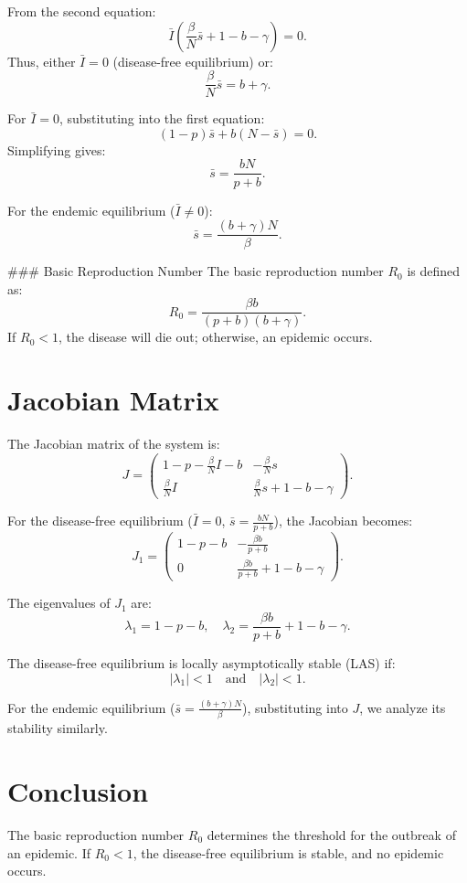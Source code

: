 \documentclass[10pt]{article}
\begin{document}
From the second equation:
\[
\bar{I} \left( \frac{\beta}{N} \bar{s} + 1 - b - \gamma \right) = 0.
\]
Thus, either \( \bar{I} = 0 \) (disease-free equilibrium) or:
\[
\frac{\beta}{N} \bar{s} = b + \gamma.
\]

For \( \bar{I} = 0 \), substituting into the first equation:
\[
(1-p)\bar{s} + b(N - \bar{s}) = 0.
\]
Simplifying gives:
\[
\bar{s} = \frac{bN}{p + b}.
\]

For the endemic equilibrium (\( \bar{I} \neq 0 \)):
\[
\bar{s} = \frac{(b + \gamma)N}{\beta}.
\]

### Basic Reproduction Number
The basic reproduction number \( R_0 \) is defined as:
\[
R_0 = \frac{\beta b}{(p + b)(b + \gamma)}.
\]
If \( R_0 < 1 \), the disease will die out; otherwise, an epidemic occurs.

\section*{Jacobian Matrix}

The Jacobian matrix of the system is:
\[
J =
\begin{pmatrix}
1-p - \frac{\beta}{N}I - b & -\frac{\beta}{N}s \\
\frac{\beta}{N}I & \frac{\beta}{N}s + 1 - b - \gamma
\end{pmatrix}.
\]

For the disease-free equilibrium (\( \bar{I} = 0 \), \( \bar{s} = \frac{bN}{p+b} \)), the Jacobian becomes:
\[
J_1 =
\begin{pmatrix}
1-p-b & -\frac{\beta b}{p+b} \\
0 & \frac{\beta b}{p+b} + 1 - b - \gamma
\end{pmatrix}.
\]

The eigenvalues of \( J_1 \) are:
\[
\lambda_1 = 1-p-b, \quad \lambda_2 = \frac{\beta b}{p+b} + 1 - b - \gamma.
\]

The disease-free equilibrium is locally asymptotically stable (LAS) if:
\[
|\lambda_1| < 1 \quad \text{and} \quad |\lambda_2| < 1.
\]

For the endemic equilibrium (\( \bar{s} = \frac{(b+\gamma)N}{\beta} \)), substituting into \( J \), we analyze its stability similarly.

\section*{Conclusion}
The basic reproduction number \( R_0 \) determines the threshold for the outbreak of an epidemic. If \( R_0 < 1 \), the disease-free equilibrium is stable, and no epidemic occurs.
\end{document}
